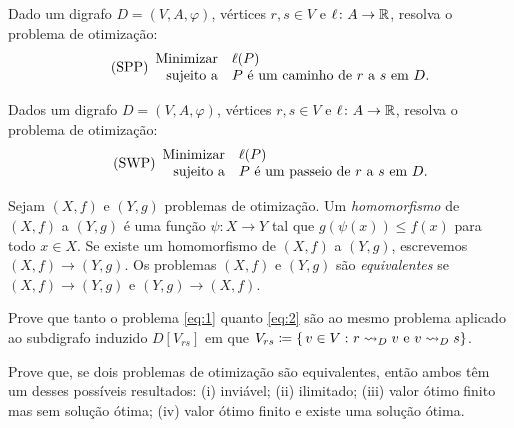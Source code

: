 \documentclass[10pt,reqno]{amsart}
\begin{document}
\begin{problem*}
  Dado um digrafo \(D = (V,A,\varphi)\), vértices \(r,s \in V\) e
  \(\ell \colon A \to \mathbb{R}\), resolva o problema de otimização:
  \begin{equation}
    \label{eq:2}
    \tag{SPP}
    \begin{array}{{rl}}
      \text{Minimizar} & \ell(P) \\
      \text{sujeito a} & \text{\(P\) é um caminho de~\(r\) a~\(s\) em~\(D\)}.
    \end{array}
  \end{equation}
\end{problem*}

\begin{problem*}
  Dados um digrafo \(D = (V,A,\varphi)\), vértices \(r,s \in V\) e
  \(\ell \colon A \to \mathbb{R}\), resolva o problema de otimização:
  \begin{equation}
    \label{eq:3}
    \tag{SWP}
    \begin{array}{{rl}}
      \text{Minimizar}   & \ell(P) \\
      \text{sujeito a} & \text{\(P\) é um passeio de \(r\) a \(s\) em~\(D\)}.
    \end{array}
  \end{equation}
\end{problem*}

\begin{definition*}
  Sejam \((X,f)\) e \((Y,g)\) problemas de otimização.  Um
  \emph{homomorfismo} de \((X,f)\) a \((Y,g)\) é uma função
  \(\psi \colon X \to Y\) tal que \(g(\psi(x)) \leq f(x)\) para todo
  \(x \in X\). Se existe um homomorfismo de \((X,f)\) a
  \((Y,g)\), escrevemos \((X,f) \to (Y,g)\). Os problemas \((X,f)\) e
  \((Y,g)\) são \emph{equivalentes} se \((X,f) \to (Y,g)\) e
  \((Y,g) \to (X,f)\).
\end{definition*}

\begin{exercise}
  \label{ex:1}
  Prove que tanto o problema \eqref{eq:1} quanto \eqref{eq:2} são
  ao mesmo problema aplicado ao subdigrafo induzido \(D[V_{rs}]\)
  em que
  \(V_{rs} \coloneqq \{\,{v \in V}\,\colon{r \rightsquigarrow_D v \text{ e }v
    \rightsquigarrow_D s}\}\).
\end{exercise}

\begin{exercise}
  Prove que, se dois problemas de otimização são equivalentes, então
  ambos têm um desses possíveis resultados: (i) inviável; (ii) ilimitado;
  (iii) valor ótimo finito mas sem solução ótima; (iv) valor ótimo finito
  e existe uma solução ótima.
\end{exercise}
\end{document}
